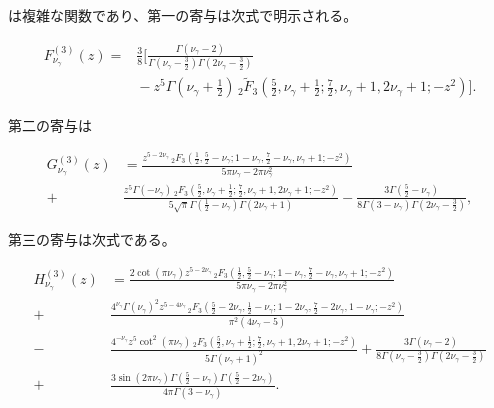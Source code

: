\documentclass[a4paper,11pt]{ltjsarticle}
\numberwithin{equation}{section}
\begin{document}
は複雑な関数であり、第一の寄与は次式で明示される。

\begin{equation}\label{eq:F3beta}
\begin{aligned}
F^{(3)}_{\nu_\gamma}(z)={}&\frac{3}{8}\Bigg[\frac{\Gamma(\nu_\gamma-2)}{\Gamma\left(\nu_\gamma-\frac32\right)\Gamma\left(2\nu_\gamma-\frac32\right)}\\
&{}-z^5\Gamma\left(\nu_\gamma+\frac12\right)\,{}_2\tilde F_3\left(\frac52,\nu_\gamma+\frac12;\frac72,\nu_\gamma+1,2\nu_\gamma+1;-z^2\right)\Bigg].
\end{aligned}
\end{equation}

第二の寄与は

\begin{align}\label{eq:G3beta}
    G^{(3)}_{\nu_\gamma}(z) &= \frac{z^{5-2 \nu_\gamma } \, _2F_3\left(\frac{1}{2},\frac{5}{2}-\nu_\gamma ;1-\nu_\gamma ,\frac{7}{2}-\nu_\gamma ,\nu_\gamma +1;-z^2\right)}{5 \pi  \nu_\gamma -2 \pi  \nu_\gamma ^2} \nonumber \\
    +&\frac{z^5 \Gamma (-\nu_\gamma ) \, _2F_3\left(\frac{5}{2},\nu_\gamma +\frac{1}{2};\frac{7}{2},\nu_\gamma +1,2 \nu_\gamma +1;-z^2\right)}{5 \sqrt{\pi } \Gamma \left(\frac{1}{2}-\nu_\gamma \right) \Gamma (2 \nu_\gamma +1)}-\frac{3 \Gamma \left(\frac{5}{2}-\nu_\gamma \right)}{8 \Gamma (3-\nu_\gamma ) \Gamma \left(2 \nu_\gamma -\frac{3}{2}\right)},
\end{align}

第三の寄与は次式である。

\begin{align}\label{eq:H3beta}
    H^{(3)}_{\nu_\gamma}(z) &=\frac{2 \cot (\pi  \nu_\gamma ) z^{5-2 \nu_\gamma } \, _2F_3\left(\frac{1}{2},\frac{5}{2}-\nu_\gamma ;1-\nu_\gamma ,\frac{7}{2}-\nu_\gamma ,\nu_\gamma +1;-z^2\right)}{5 \pi  \nu_\gamma -2 \pi  \nu_\gamma ^2} \nonumber \\
    +&\frac{4^{\nu_\gamma } \Gamma (\nu_\gamma )^2 z^{5-4 \nu_\gamma } \, _2F_3\left(\frac{5}{2}-2 \nu_\gamma ,\frac{1}{2}-\nu_\gamma ;1-2 \nu_\gamma ,\frac{7}{2}-2 \nu_\gamma ,1-\nu_\gamma ;-z^2\right)}{\pi ^2 (4 \nu_\gamma -5)} \nonumber \\ 
    -&\frac{4^{-\nu_\gamma } z^5 \cot ^2(\pi  \nu_\gamma ) \, _2F_3\left(\frac{5}{2},\nu_\gamma +\frac{1}{2};\frac{7}{2},\nu_\gamma +1,2 \nu_\gamma +1;-z^2\right)}{5 \Gamma (\nu_\gamma +1)^2}+\frac{3 \Gamma (\nu_\gamma -2)}{8 \Gamma \left(\nu_\gamma -\frac{3}{2}\right) \Gamma \left(2 \nu_\gamma -\frac{3}{2}\right)} \nonumber \\
    +&\frac{3 \sin (2 \pi  \nu_\gamma ) \Gamma \left(\frac{5}{2}-\nu_\gamma \right) \Gamma \left(\frac{5}{2}-2 \nu_\gamma \right)}{4 \pi  \Gamma (3-\nu_\gamma )}.
\end{align}
\end{document}

